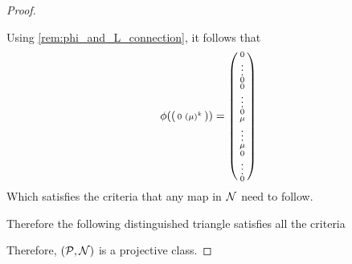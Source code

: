 \begin{proof}
\begin{enumerate}
{            Using \autoref{rem:phi_and_L_connection}, it follows that
            \[
                \phi(
                    \begin{psmallmatrix}
                        0 & ( \mu )^k
                    \end{psmallmatrix}
                    ) =
                \begin{psmallmatrix}
                    0 \\
                    \vdots \\
                    0 \\
                    0 \\
                    \vdots \\
                    0 \\
                    \mu \\
                    \vdots \\
                    \mu \\
                    0 \\
                    \vdots \\
                    0
                \end{psmallmatrix}
            \]
            Which satisfies the criteria that any map in \( {\mathcal{N}} \) need to follow.

            Therefore the following distinguished triangle satisfies all the criteria
            \begin{center}
            \end{center}
        }
    \end{enumerate}
    Therefore, \( ({\mathcal{P}}, {\mathcal{N}}) \) is a projective class.
\end{proof}